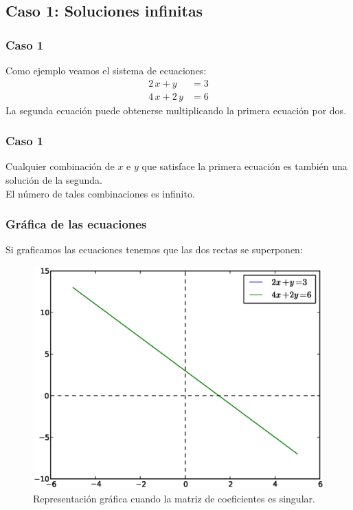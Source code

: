 \subsection*{Caso 1: Soluciones infinitas}
\begin{frame}
\frametitle{Caso 1}
Como ejemplo veamos el sistema de ecuaciones:
\begin{align*}
2 \, x + y &= 3 \\
4 \,x + 2 \, y &= 6
\end{align*}
\pause
La segunda ecuación puede obtenerse multiplicando la primera ecuación por dos.
\end{frame}
\begin{frame}
\frametitle{Caso 1}
Cualquier combinación de $x$ e $y$ que satisface la primera ecuación es también una solución de la segunda.
\\
\bigskip
El número de tales combinaciones es infinito.
\end{frame}
\begin{frame}
\frametitle{Gráfica de las ecuaciones}
Si graficamos las ecuaciones tenemos que las dos rectas se superponen:
\begin{figure}
	\centering
	\includegraphics[scale=0.3]{Imagenes/Grafica01.eps}
	\caption{Representación gráfica cuando la matriz de coeficientes es singular.}
\end{figure}
\end{frame}
